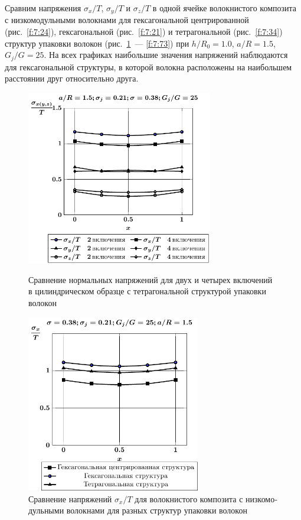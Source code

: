 \begin{russian}
Сравним напряжения $\sigma_x/T$, $\sigma_y/T$ и $\sigma_z/T$ в одной ячейке волокнистого композита с низкомодульными волокнами для гексагональной центрированной (рис.~\ref{f:7:24}), гексагональной (рис.~\ref{f:7:21}) и тетрагональной (рис.~\ref{f:7:34}) структур упаковки волокон (рис.~\ref{f:7:71}~--- \ref{f:7:73}) при $h/R_0=1.0$, $a/R=1.5$, $G_j/G=25$. На всех графиках наибольшие значения напряжений наблюдаются для гексагональной структуры, в которой волокна расположены на наибольшем расстоянии друг относительно друга. 

\begin{figure}[h!]
\centering\footnotesize
\parbox[b]{7.5cm}{\centering\includegraphics[width=8.1cm]{inc4-2.pdf}
\caption{Сравнение нормальных напряжений для двух и четырех включений в цилиндрическом образце с тетрагональной структурой упаковки волокон
\label{f:7:70}}}\hfil\hfil
\parbox[b]{7.5cm}{\centering\includegraphics[width=7.6cm]{inc7-6-4-sig_x.pdf}
\caption{Сравнение напряжений $\sigma_x/T$ для волокнистого композита с низкомодульными волокнами для разных структур упаковки волокон
\label{f:7:71}}}
\end{figure}


\end{russian}
